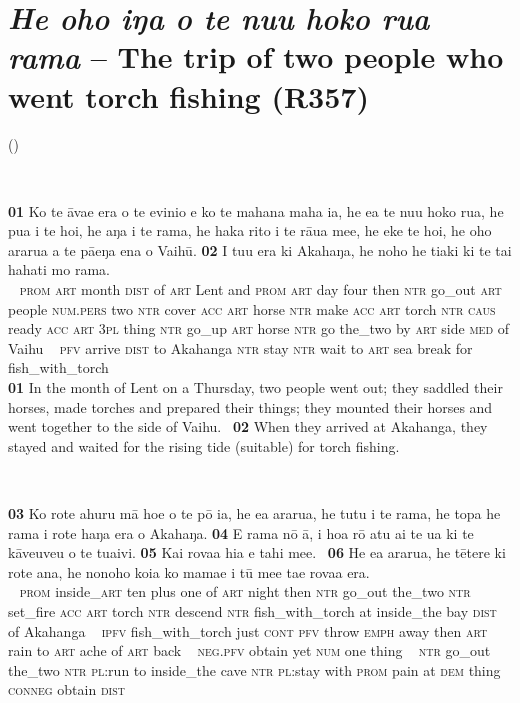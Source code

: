 {\newpage
\section*{\textit{He oho iŋa o te nu{\ꞌ}u hoko rua rama} – The trip of two people who went torch fishing (R357)} \label{sec:a.3}
(\citealt[Vol. 5:22–23]{WeberWeber1990Mai})

~

\bigskip\gll
\textbf{\textup{01}} Ko te {\ꞌ}āva{\ꞌ}e era o te evinio {\ꞌ}e ko te mahana maha ia, he e{\ꞌ}a te nu{\ꞌ}u hoko rua, he pu{\ꞌ}a i te hoi, he aŋa i te rama, he haka rito i te rāua me{\ꞌ}e, he eke te hoi, he oho ararua a te pā{\ꞌ}eŋa ena o Vaihū. \textbf{\textup{02}} I tu{\ꞌ}u era ki {\ꞌ}Akahaŋa, he noho he tiaki ki te tai hahati mo rama.\\
~ \textsc{prom} \textsc{art} month \textsc{dist} of \textsc{art} Lent and \textsc{prom} \textsc{art} day four then \textsc{ntr} go\_out \textsc{art} people \textsc{num.pers} two \textsc{ntr} cover \textsc{acc} \textsc{art} horse \textsc{ntr} make \textsc{acc} \textsc{art} torch \textsc{ntr} \textsc{caus} ready \textsc{acc} \textsc{art} \textsc{3pl} thing \textsc{ntr} go\_up \textsc{art} horse \textsc{ntr} go the\_two by \textsc{art} side \textsc{med} of Vaihu ~ \textsc{pfv} arrive \textsc{dist} to Akahanga \textsc{ntr} stay \textsc{ntr} wait to \textsc{art} sea break for fish\_with\_torch\\

\medskip\glt
\textbf{\textup{01}} In the month of Lent on a Thursday, two people went out; they saddled their horses, made torches and prepared their things; they mounted their horses and went together to the side of Vaihu. ~\textbf{\textup{02}} When they arrived at Akahanga, they stayed and waited for the rising tide (suitable) for torch fishing.


~

\bigskip\gll
\textbf{\textup{03}} Ko rote {\ꞌ}ahuru mā ho{\ꞌ}e o te pō ia, he e{\ꞌ}a ararua, he tutu i te rama, he topa he rama {\ꞌ}i rote haŋa era o {\ꞌ}Akahaŋa. \textbf{\textup{04}} E rama nō {\ꞌ}ā, i hoa rō atu ai te {\ꞌ}ua ki te kāve{\ꞌ}uve{\ꞌ}u o te tua{\ꞌ}ivi. \textbf{\textup{05}} Kai rova{\ꞌ}a hia e tahi me{\ꞌ}e. ~\textbf{\textup{06}} He e{\ꞌ}a ararua, he tētere ki rote {\ꞌ}ana, he nonoho koia ko mamae {\ꞌ}i tū me{\ꞌ}e ta{\ꞌ}e rova{\ꞌ}a era.\\
~ \textsc{prom} inside\_\textsc{art} ten plus one of \textsc{art} night then \textsc{ntr} go\_out the\_two \textsc{ntr} set\_fire \textsc{acc} \textsc{art} torch \textsc{ntr} descend \textsc{ntr} fish\_with\_torch at inside\_the bay \textsc{dist} of Akahanga  ~ \textsc{ipfv} fish\_with\_torch just \textsc{cont} \textsc{pfv} throw \textsc{emph} away then \textsc{art} rain to \textsc{art} ache of \textsc{art} back ~ \textsc{neg.pfv} obtain yet \textsc{num} one thing ~ \textsc{ntr} go\_out the\_two \textsc{ntr} \textsc{pl}:run to inside\_the cave \textsc{ntr} \textsc{pl}:stay with \textsc{prom} pain at \textsc{dem} thing \textsc{conneg} obtain \textsc{dist}\\

}
